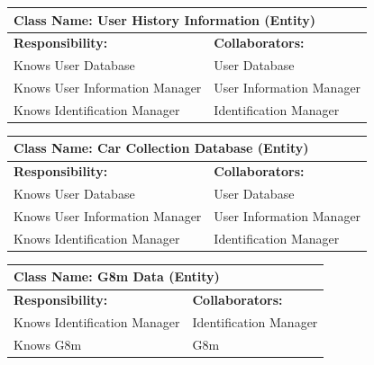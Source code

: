 \documentclass[]{article}
\begin{document}
\begin{table}[ht]
    \centering
    \begin{tabular}{|p{5cm}|p{5cm}|}
        \hline
        \multicolumn{2}{|l|}{\textbf{Class Name: User History Information (Entity)}} \\
        \hline
        \textbf{Responsibility:} & \textbf{Collaborators:} \\
        \hline
        Knows User Database & User Database \\
        Knows User Information Manager & User Information Manager \\
        Knows Identification Manager & Identification Manager \\
        \hline
    \end{tabular}
\end{table}
 
\begin{table}[ht]
    \centering
    \begin{tabular}{|p{5cm}|p{5cm}|}
        \hline
        \multicolumn{2}{|l|}{\textbf{Class Name: Car Collection Database (Entity)}} \\
        \hline
        \textbf{Responsibility:} & \textbf{Collaborators:} \\
        \hline
        Knows User Database & User Database \\
        Knows User Information Manager & User Information Manager \\
        Knows Identification Manager & Identification Manager \\
        \hline
    \end{tabular}
\end{table}

\begin{table}[ht]
    \centering
    \begin{tabular}{|p{5cm}|p{5cm}|}
        \hline
        \multicolumn{2}{|l|}{\textbf{Class Name: G8m Data (Entity)}} \\
        \hline
        \textbf{Responsibility:} & \textbf{Collaborators:} \\
        \hline
        Knows Identification Manager & Identification Manager \\
        Knows G8m & G8m \\
        \hline
    \end{tabular}
\end{table}
 
\end{document}
